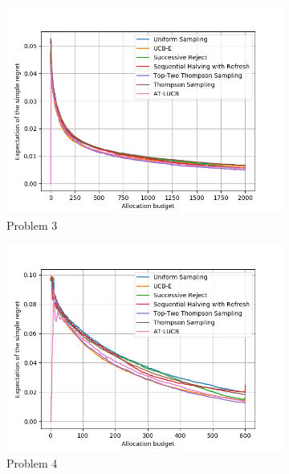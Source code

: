 \begin{figure}[ht]
\begin{subfigure}[t]{0.25\textwidth}
    \centering\includegraphics[width=\textwidth]{Chapter6/img/bai/setting3.png}
    \caption{Problem 3}
  \end{subfigure}%
  \begin{subfigure}[t]{0.25\textwidth}
    \centering\includegraphics[width=\textwidth]{Chapter6/img/bai/setting4.png}
    \caption{Problem 4}
  \end{subfigure}
  \begin{subfigure}[t]{0.25\textwidth}

\end{subfigure}
\end{figure}
